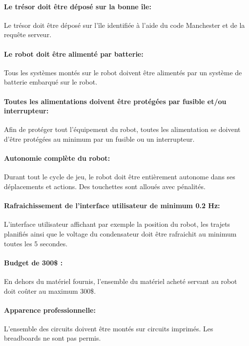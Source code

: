 \paragraph{Le trésor doit être déposé sur la bonne île:}
Le trésor doit être déposé sur l'île identifiée à l'aide du code Manchester et de la requête serveur.

\paragraph{Le robot doit être alimenté par batterie:}
Tous les systèmes montés sur le robot doivent être alimentés par un système de batterie embarqué sur le robot.

\paragraph{Toutes les alimentations doivent être protégées par fusible et/ou interrupteur:}
Afin de protéger tout l'équipement du robot, toutes les alimentation se doivent d'être protégées au minimum par un fusible ou un interrupteur.

\paragraph{Autonomie complète du robot:}
Durant tout le cycle de jeu, le robot doit être entièrement autonome dans ses déplacements et actions. Des touchettes sont alloués avec pénalités.

\paragraph{Rafraichissement de l'interface utilisateur de minimum 0.2 Hz:}
L'interface utilisateur affichant par exemple la position du robot, les trajets planifiés ainsi que le voltage du condensateur doit être rafraichit au minimum toutes les 5 secondes.

\paragraph{Budget de 300\$ :}
En dehors du matériel fournis, l'ensemble du matériel acheté servant au robot doit coûter au maximum 300\$.

\paragraph{Apparence professionnelle:}
L'ensemble des circuits doivent être montés sur circuits imprimés. Les breadboards ne sont pas permis.

